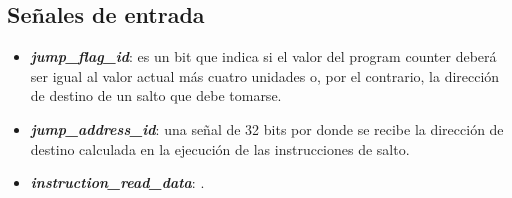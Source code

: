 \subsection*{Señales de entrada}

\begin{itemize}
  \vspace{-0.2cm}
  \item \textbf{\textit{jump_flag_id}}: es un bit que indica si el valor del program counter deberá ser igual al valor actual más cuatro unidades o, por el contrario, la dirección de destino de un salto que debe tomarse.
  \item \textbf{\textit{jump_address_id}}: una señal de 32 bits por donde se recibe la dirección de destino calculada en la ejecución de las instrucciones de salto.
  \item \textbf{\textit{instruction_read_data}}: .
\end{itemize}